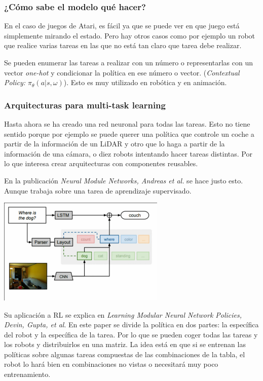 \subsubsection{¿Cómo sabe el modelo qué hacer?}%
\label{ssub:_cómo_sabe_el_modelo_qué_hacer_}

En el caso de juegos de Atari, es fácil ya que se puede ver en que juego está simplemente
mirando el estado. Pero hay otros casos como por ejemplo un robot que realice varias tareas en
las que no está tan claro que tarea debe realizar.

Se pueden enumerar las tareas a realizar con un número o representarlas con un vector
\textit{one-hot} y condicionar la política en ese número o vector. (\textit{Contextual Policy:
$\pi_\theta(a|s,\omega)$}). Esto es muy utilizado en robótica y en animación.

\subsubsection{Arquitecturas para multi-task learning}%
\label{ssub:arquitecturas_para_multi_task_learning}

Hasta ahora se ha creado una red neuronal para todas las tareas. Esto no tiene sentido porque
por ejemplo se puede querer una política que controle un coche a partir de la información de
un LiDAR y otro que lo haga a partir de la información de una cámara, o diez robots
intentando hacer tareas distintas. Por lo que interesa crear arquitecturas con componentes
reusables.

En la publicación \textit{Neural Module Networks, Andreas et al.} se hace justo esto. Aunque
trabaja sobre una tarea de aprendizaje supervisado.

\begin{center}
\includegraphics[width=0.6\textwidth]{figures/2020-07-12-200852_582x371_scrot.png}
\end{center}

Su aplicación a RL se explica en \textit{Learning Modular Neural Network Policies, Devin,
Gupta, et al}. En este paper se divide la política en dos partes: la específica del robot y la
específica de la tarea. Por lo que se pueden coger todas las tareas y los robots y distribuirlos
en una matriz. La idea está en que si se entrenan las políticas sobre algunas tareas
compuestas de las combinaciones de la tabla, el robot lo hará bien en combinaciones no vistas o
necesitará muy poco entrenamiento.

